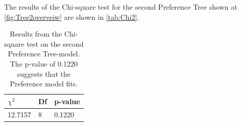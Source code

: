 \noindent
%
The results of the Chi-square test for the second Preference Tree shown at \autoref{fig:Tree2overveiw} are shown in \autoref{tab:Chi2}. 
%
\begin{table}[H]
\centering
\begin{tabular}{@{}lll@{}}
\toprule
$\chi^{2}$   & Df  & p-value \\ \midrule
12.7157      & 8   & 0.1220  \\ \bottomrule
\end{tabular}
\caption{Results from the Chi-square test on the second Preference Tree-model. The p-value of 0.1220 suggests that the Preference model fits.}
\label{tab:Chi2}
\end{table} 